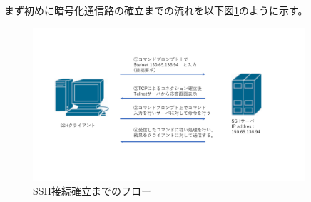 \documentclass[12pt,a4paper,titlepage]{jsarticle}
\begin{document}
まず初めに暗号化通信路の確立までの流れを以下図\ref{SSH_flow}のように示す。
\begin{figure}[h]
    \centering
    \includegraphics[width=0.9\textwidth, page=5]{graphs/network_archtecture.pdf}
    \caption{SSH接続確立までのフロー}
    \label{SSH_flow}
\end{figure}

\end{document}
